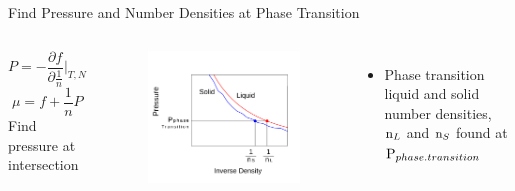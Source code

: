 \documentclass{beamer}
\begin{document}
\begin{frame}{Find Pressure and Number Densities at  Phase Transition}
\begin{columns}[t]
\begin{block}{}
\begin{itemize}
				 \begin{displaymath}{P = -\frac{\partial{f}}{\partial{\frac{1}{n}}}\bigg|_{T,N}}\end{displaymath} 
				 \begin{displaymath} \mu = f + \frac{1}{n}P\end{displaymath}		
				 Find pressure at intersection 		
			\end{itemize}
	    \end{block}	    
		\vspace{-2em}
            \begin{figure}
                \centering
                \includegraphics[width=0.9\columnwidth]{figs/MaxwellDTC-Fig3-realplot.pdf}
            \end{figure}
            \vspace{-.5em}
			\begin{itemize} 						
			    \item Phase transition liquid and solid number densities, $\text n_L$ and $\text n_S$ found at $\text P_{phase.transition}$
			\end{itemize}
            
	\end{columns}	
\end{frame}
\end{document}
